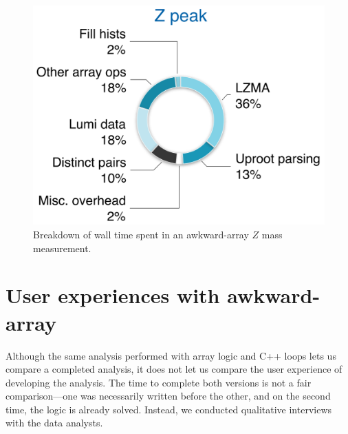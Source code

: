 \documentclass[a4paper]{jpconf}
\begin{document}
\begin{figure}
\begin{center}
\includegraphics[width=0.5\linewidth]{zpeak-performance-breakdown.png}
\end{center}

\caption{Breakdown of wall time spent in an awkward-array $Z$ mass measurement. \label{fig:zpeak}}
\end{figure}

\section{User experiences with awkward-array}

Although the same analysis performed with array logic and C++ loops lets us compare a completed analysis, it does not let us compare the user experience of developing the analysis. The time to complete both versions is not a fair comparison---one was necessarily written before the other, and on the second time, the logic is already solved. Instead, we conducted qualitative interviews with the data analysts.








\end{document}
